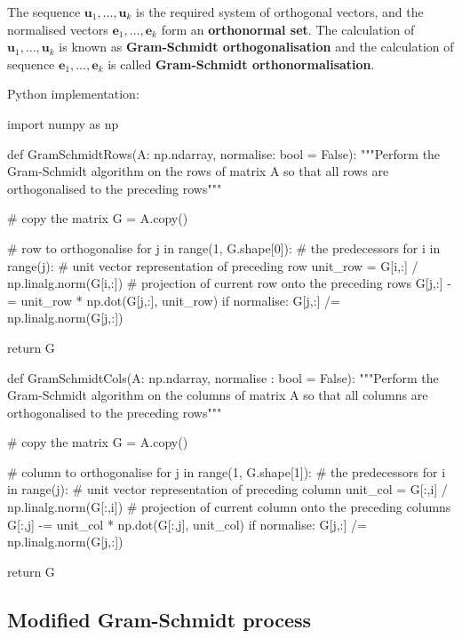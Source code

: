The sequence $ \mathbf{u}_1, \dots , \mathbf{u}_k $ is the required system of
orthogonal vectors, and the normalised vectors $ \mathbf{e}_1, \dots, \mathbf{e}_k $
form an \textbf{orthonormal set}. The calculation of  $ \mathbf{u}_1, \dots , \mathbf{u}_k $
is known as \textbf{Gram-Schmidt orthogonalisation} and the calculation of sequence
$ \mathbf{e}_1, \dots , \mathbf{e}_k $ is called \textbf{Gram-Schmidt orthonormalisation}.

Python implementation:

\begin{python}
import numpy as np

def GramSchmidtRows(A: np.ndarray, normalise: bool = False):
    """Perform the Gram-Schmidt algorithm on the rows of matrix A so that all
    rows are orthogonalised to the preceding rows"""

    # copy the matrix
    G = A.copy()

    # row to orthogonalise
    for j in range(1, G.shape[0]):
        # the predecessors
        for i in range(j):
            # unit vector representation of preceding row
            unit_row = G[i,:] / np.linalg.norm(G[i,:])
            # projection of current row onto the preceding rows
            G[j,:] -= unit_row * np.dot(G[j,:], unit_row)
        if normalise:
            G[j,:] /= np.linalg.norm(G[j,:])

    return G

def GramSchmidtCols(A: np.ndarray, normalise : bool = False):
    """Perform the Gram-Schmidt algorithm on the columns of matrix A so that all
    columns are orthogonalised to the preceding rows"""

    # copy the matrix
    G = A.copy()

    # column to orthogonalise
    for j in range(1, G.shape[1]):
        # the predecessors
        for i in range(j):
            # unit vector representation of preceding column
            unit_col = G[:,i] / np.linalg.norm(G[:,i])
            # projection of current column onto the preceding columns
            G[:,j] -= unit_col * np.dot(G[:,j], unit_col)
        if normalise:
            G[j,:] /= np.linalg.norm(G[j,:])

    return G
\end{python}


\subsection{Modified Gram-Schmidt process}

